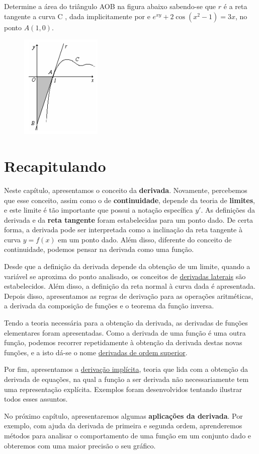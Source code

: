 \cleardoublepage\documentclass[../main.tex]{subfiles}
\begin{document}
\begin{exer}
Determine a área do triângulo AOB na figura abaixo sabendo-se que $r$ é a reta tangente a curva C , 
dada implicitamente por e $e^{xy}+2\cos(x^2- 1)= 3x$, no ponto $A( 1, 0 ) $. 
\begin{figure}[H]
    \centering
    \includegraphics[scale=1.2]{3-cap_derivadas/fig_deriv/triangsomb.png}
   \end{figure}
\end{exer}
\section{Recapitulando}
Neste capítulo, apresentamos o conceito da \textbf{derivada}. Novamente, percebemos que esse conceito, assim como o de \textbf{continuidade}, depende da teoria de \textbf{limites}, e este limite é tão importante que possui a notação específica \(y'\). As definições da derivada e da \textbf{reta tangente} foram estabelecidas para um ponto dado. De certa forma, a derivada pode ser interpretada como a inclinação da reta tangente à curva \(y=f(x)\) em um ponto dado. Além disso, diferente do conceito de continuidade, podemos pensar na derivada como uma função.

Desde que a definição da derivada depende da obtenção de um limite, quando a variável se aproxima do ponto analisado, os conceitos de \hyperlink{DerivLaterais}{derivadas laterais} são estabelecidos. Além disso, a definição da reta normal à curva dada é apresentada. Depois disso, apresentamos as regras de derivação para as operações aritméticas, a derivada da composição de funções e o teorema da função inversa.

Tendo a teoria necessária para a obtenção da derivada, as derivadas de funções elementares foram apresentadas. Como a derivada de uma função é uma outra função, podemos recorrer repetidamente à obtenção da derivada destas novas funções, e a isto dá-se o nome \hyperlink{DerivOrdemSup}{derivadas de ordem superior}.


Por fim, apresentamos a \hyperlink{DerivImplicita} {derivação implícita}, teoria que lida com a obtenção da derivada de equações, na qual a função a ser derivada não necessariamente tem uma representação explícita. Exemplos foram desenvolvidos tentando ilustrar todos esses assuntos.

No próximo capítulo, apresentaremos algumas \textbf{aplicações da derivada}. Por exemplo, com ajuda da derivada de primeira e segunda ordem, aprenderemos métodos para analisar o comportamento de uma função em um conjunto dado e obteremos com uma maior precisão o seu gráfico.
\end{document}
